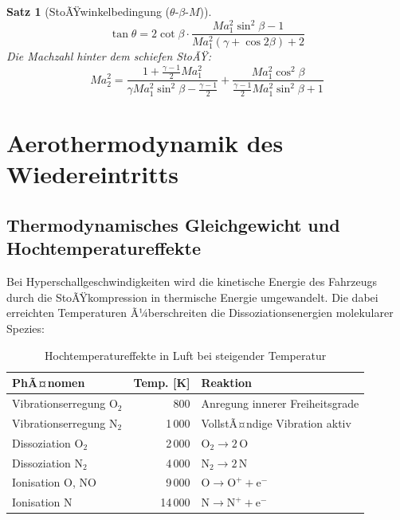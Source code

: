﻿\documentclass[12pt,a4paper]{article}
\newtheorem{satz}{Satz}[section]
\newcommand{\Ma}{M\!a}
\begin{document}
\begin{satz}[StoÃŸwinkelbedingung ($\theta$-$\beta$-$M$)]
\[
  \tan\theta = 2\cot\beta\cdot
    \frac{\Ma_1^2\sin^2\beta - 1}{\Ma_1^2(\gamma + \cos 2\beta) + 2}
\]
Die Machzahl hinter dem schiefen StoÃŸ:
\[
  \Ma_2^2 = \frac{1 + \frac{\gamma-1}{2}\Ma_1^2}
    {\gamma\Ma_1^2\sin^2\beta - \frac{\gamma-1}{2}}
    + \frac{\Ma_1^2\cos^2\beta}
    {\frac{\gamma-1}{2}\Ma_1^2\sin^2\beta + 1}
\]
\end{satz}

\section{Aerothermodynamik des Wiedereintritts}

\subsection{Thermodynamisches Gleichgewicht und Hochtemperatureffekte}

Bei Hyperschallgeschwindigkeiten wird die kinetische Energie des Fahrzeugs durch
die StoÃŸkompression in thermische Energie umgewandelt. Die dabei erreichten
Temperaturen Ã¼berschreiten die Dissoziationsenergien molekularer Spezies:

\begin{table}[H]
\centering
\caption{Hochtemperatureffekte in Luft bei steigender Temperatur}
\label{tab:hochtemp}
\begin{tabular}{lrl}
\toprule
\textbf{PhÃ¤nomen} & \textbf{Temp. [K]} & \textbf{Reaktion}\\
\midrule
Vibrationserregung O$_2$        & 800    & Anregung innerer Freiheitsgrade\\
Vibrationserregung N$_2$        & 1\,000 & VollstÃ¤ndige Vibration aktiv\\
Dissoziation O$_2$              & 2\,000 & $\mathrm{O_2 \to 2\,O}$\\
Dissoziation N$_2$              & 4\,000 & $\mathrm{N_2 \to 2\,N}$\\
Ionisation O, NO                & 9\,000 & $\mathrm{O \to O^+ + e^-}$\\
Ionisation N                    & 14\,000& $\mathrm{N \to N^+ + e^-}$\\
\bottomrule
\end{tabular}
\end{table}
\end{document}
